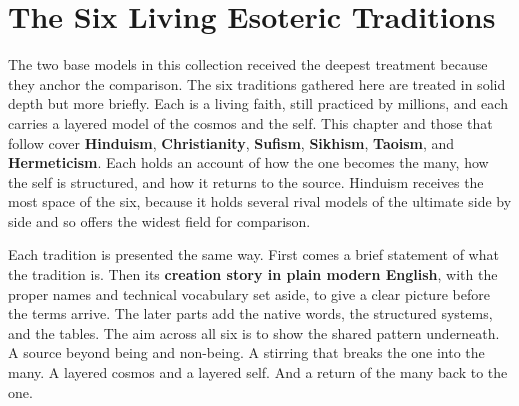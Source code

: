 \chapter{The Six Living Esoteric Traditions}

The two base models in this collection received the deepest treatment because they anchor the comparison. The six traditions gathered here are treated in solid depth but more briefly. Each is a living faith, still practiced by millions, and each carries a layered model of the cosmos and the self. This chapter and those that follow cover \textbf{Hinduism}, \textbf{Christianity}, \textbf{Sufism}, \textbf{Sikhism}, \textbf{Taoism}, and \textbf{Hermeticism}. Each holds an account of how the one becomes the many, how the self is structured, and how it returns to the source. Hinduism receives the most space of the six, because it holds several rival models of the ultimate side by side and so offers the widest field for comparison.

Each tradition is presented the same way. First comes a brief statement of what the tradition is. Then its \textbf{creation story in plain modern English}, with the proper names and technical vocabulary set aside, to give a clear picture before the terms arrive. The later parts add the native words, the structured systems, and the tables. The aim across all six is to show the shared pattern underneath. A source beyond being and non-being. A stirring that breaks the one into the many. A layered cosmos and a layered self. And a return of the many back to the one.
